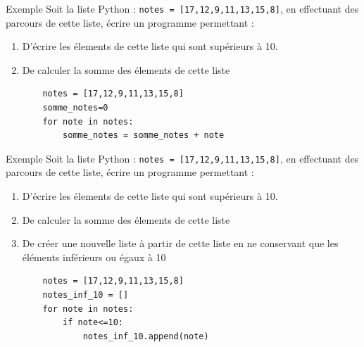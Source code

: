 \documentclass[10pt]{beamer}
\begin{document}
\begin{frame}[fragile]
	\mframe{\Python}
	\begin{exampleblock}{Exemple}
		Soit la liste Python : {\tt notes = [17,12,9,11,13,15,8]}, en effectuant des parcours de cette liste, écrire un programme permettant :
		\begin{enumerate}
			\item D'écrire les élements de cette liste qui sont supérieurs à 10.
			\item De calculer la somme des élements de cette liste
			      \begin{lstlisting}
	notes = [17,12,9,11,13,15,8]
	somme_notes=0
	for note in notes:
		somme_notes = somme_notes + note
\end{lstlisting}
		\end{enumerate}
	\end{exampleblock}
\end{frame}

\begin{frame}[fragile]
	\mframe{\Python}
	\begin{exampleblock}{Exemple}
		Soit la liste Python : {\tt notes = [17,12,9,11,13,15,8]}, en effectuant des parcours de cette liste, écrire un programme permettant :
		\begin{enumerate}
			\item D'écrire les élements de cette liste qui sont supérieurs à 10.
			\item De calculer la somme des élements de cette liste
			\item De créer une nouvelle liste à partir de cette liste en ne conservant que les éléments inférieurs ou égaux à 10
			      \begin{lstlisting}
	notes = [17,12,9,11,13,15,8]
	notes_inf_10 = []
	for note in notes:
		if note<=10:
			notes_inf_10.append(note)
\end{lstlisting}
		\end{enumerate}
	\end{exampleblock}
\end{frame}
\end{document}
